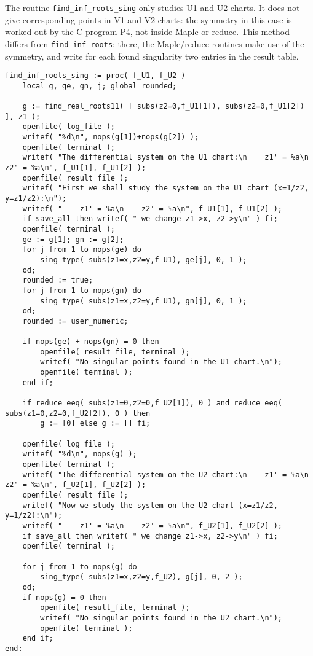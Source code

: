 \documentclass[a4paper,10pt]{article}
\begin{document}
The routine \verb+find_inf_roots_sing+ only studies U1 and U2
charts. It does not give corresponding points in V1 and V2 charts:
the symmetry in this case is worked out by the C program P4, not
inside Maple or reduce. This method differs from
\verb+find_inf_roots+: there, the Maple/reduce routines make use
of the symmetry, and write for each found singularity two entries
in the result table.

\begin{lstlisting}[name=infinity]
find_inf_roots_sing := proc( f_U1, f_U2 )
    local g, ge, gn, j; global rounded;

    g := find_real_roots11( [ subs(z2=0,f_U1[1]), subs(z2=0,f_U1[2]) ], z1 );
    openfile( log_file );
    writef( "%d\n", nops(g[1])+nops(g[2]) );
    openfile( terminal );
    writef( "The differential system on the U1 chart:\n    z1' = %a\n    z2' = %a\n", f_U1[1], f_U1[2] );
    openfile( result_file );
    writef( "First we shall study the system on the U1 chart (x=1/z2, y=z1/z2):\n");
    writef( "    z1' = %a\n    z2' = %a\n", f_U1[1], f_U1[2] );
    if save_all then writef( " we change z1->x, z2->y\n" ) fi;
    openfile( terminal );
    ge := g[1]; gn := g[2];
    for j from 1 to nops(ge) do
        sing_type( subs(z1=x,z2=y,f_U1), ge[j], 0, 1 );
    od;
    rounded := true;
    for j from 1 to nops(gn) do
        sing_type( subs(z1=x,z2=y,f_U1), gn[j], 0, 1 );
    od;
    rounded := user_numeric;

    if nops(ge) + nops(gn) = 0 then
        openfile( result_file, terminal );
        writef( "No singular points found in the U1 chart.\n");
        openfile( terminal );
    end if;

    if reduce_eeq( subs(z1=0,z2=0,f_U2[1]), 0 ) and reduce_eeq( subs(z1=0,z2=0,f_U2[2]), 0 ) then
        g := [0] else g := [] fi;

    openfile( log_file );
    writef( "%d\n", nops(g) );
    openfile( terminal );
    writef( "The differential system on the U2 chart:\n    z1' = %a\n    z2' = %a\n", f_U2[1], f_U2[2] );
    openfile( result_file );
    writef( "Now we study the system on the U2 chart (x=z1/z2, y=1/z2):\n");
    writef( "    z1' = %a\n    z2' = %a\n", f_U2[1], f_U2[2] );
    if save_all then writef( " we change z1->x, z2->y\n" ) fi;
    openfile( terminal );

    for j from 1 to nops(g) do
        sing_type( subs(z1=x,z2=y,f_U2), g[j], 0, 2 );
    od;
    if nops(g) = 0 then
        openfile( result_file, terminal );
        writef( "No singular points found in the U2 chart.\n");
        openfile( terminal );
    end if;
end:
\end{lstlisting}
\end{document}
